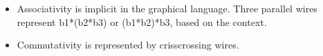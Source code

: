 \documentclass{llncs}
\begin{document}
\begin{itemize}
\item Associativity is implicit in the graphical language. Three parallel
  wires represent {{b1*(b2*b3)}} or {{(b1*b2)*b3}}, based on the context.

\item Commutativity is represented by crisscrossing wires.
\begin{multicols}{4}
\begin{center}
\end{center}
\begin{center}
\end{center}

\begin{center}
\end{center}

\begin{center}
\end{center}
\end{multicols}


\end{itemize}
\end{document}
